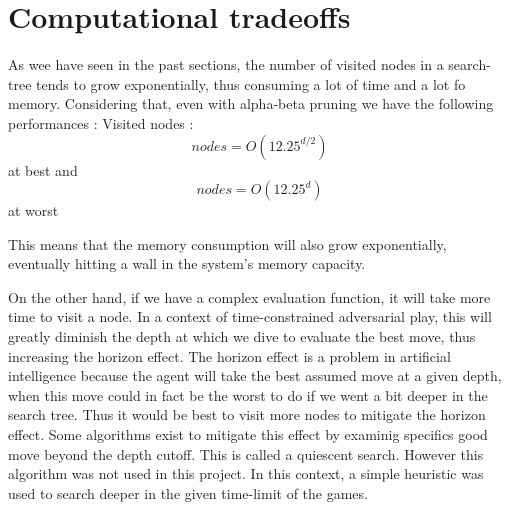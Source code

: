 \documentclass{article}
\begin{document}

\section{Computational tradeoffs}
As wee have seen in the past sections, the number of visited nodes in a search-tree tends to grow exponentially, thus consuming a lot of time and a lot fo memory. Considering that, even with alpha-beta pruning we have the following performances :
Visited nodes :
\[nodes = O(12.25^{d/2}) \] at best and \[nodes = O(12.25^{d}) \] at worst

This means that the memory consumption will also grow exponentially, eventually hitting a wall in the system's memory capacity. 

On the other hand, if we have a complex evaluation function, it will take more time to visit a node. In a context of time-constrained adversarial play, this will greatly diminish the depth at which we dive to evaluate the best move, thus increasing the horizon effect. The horizon effect is a problem in artificial intelligence because the agent will take the best assumed move at a given depth, when this move could in fact be the worst to do if we went a bit deeper in the search tree. Thus it would be best to visit more nodes to mitigate the horizon effect. Some algorithms exist to mitigate this effect by examinig specifics good move beyond the depth cutoff. This is called a quiescent search. However this algorithm was not used in this project. In this context, a simple heuristic was used to search deeper in the given time-limit of the games. 





\end{document}
